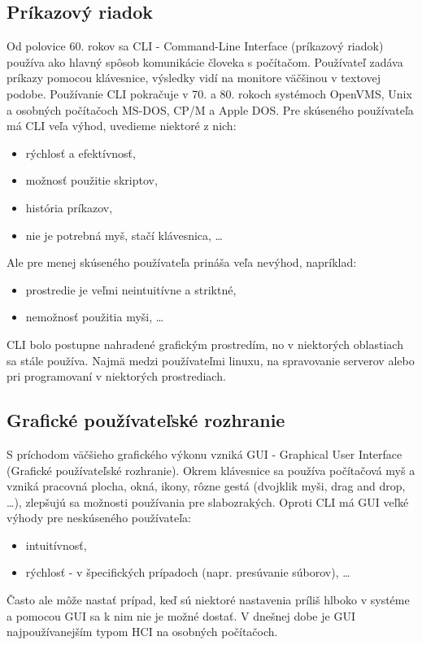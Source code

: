 \subsection{Príkazový riadok}
Od polovice 60. rokov sa CLI - Command-Line Interface (príkazový riadok) používa ako hlavný spôsob komunikácie človeka s počítačom.
Používateľ zadáva príkazy pomocou klávesnice, výsledky vidí na monitore väčšinou v textovej podobe.
Používanie CLI pokračuje v 70. a 80. rokoch systémoch OpenVMS, Unix a osobných počítačoch MS-DOS, CP/M a Apple DOS.
Pre skúseného používateľa má CLI veľa výhod, uvedieme niektoré z nich:
\begin{itemize}
	\item rýchlosť a efektívnosť,
	\item možnosť použitie skriptov,
	\item história príkazov,
	\item nie je potrebná myš, stačí klávesnica, \ldots
\end{itemize}
Ale pre menej skúseného používateľa prináša veľa nevýhod, napríklad:
\begin{itemize}
	\item prostredie je veľmi neintuitívne a striktné,
	\item nemožnosť použitia myši, \ldots
\end{itemize}
CLI bolo postupne nahradené grafickým prostredím, no v niektorých oblastiach sa stále používa. 
Najmä medzi používateľmi linuxu, na spravovanie serverov alebo pri programovaní v niektorých prostrediach.

\subsection{Grafické používateľské rozhranie}
S príchodom väčšieho grafického výkonu vzniká GUI - Graphical User Interface (Grafické používateľské rozhranie). 
Okrem klávesnice sa používa počítačová myš a vzniká pracovná plocha, okná, ikony, rôzne gestá (dvojklik myši, drag and drop, \ldots), zlepšujú sa možnosti používania pre slabozrakých.
Oproti CLI má GUI veľké výhody pre neskúseného používateľa:
\begin{itemize}
	\item intuitívnosť,
	\item rýchlosť - v špecifických prípadoch (napr. presúvanie súborov), \ldots
\end{itemize}
Často ale môže nastať prípad, keď sú niektoré nastavenia príliš hlboko v systéme a pomocou GUI sa k nim nie je možné dostať.
V dnešnej dobe je GUI najpoužívanejším typom HCI na osobných počítačoch.

